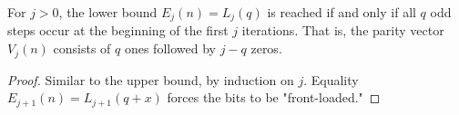 \begin{theorem}\label{theorem:E_lower_bound_iff}\leanok
For $j > 0$, the lower bound $E_j(n) = L_j(q)$ is reached if and only if all $q$ odd steps occur at the beginning of the first $j$ iterations. That is, the parity vector $V_j(n)$ consists of $q$ ones followed by $j-q$ zeros.
\end{theorem}
\begin{proof}\leanok
Similar to the upper bound, by induction on $j$. Equality $E_{j+1}(n) = L_{j+1}(q+x)$ forces the bits to be "front-loaded."
\end{proof}
